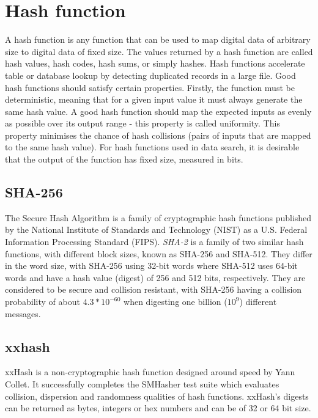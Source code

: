 \section{Hash function}
  A hash function is any function that can be used to map digital data of arbitrary size to digital data of fixed size. The values returned by a hash function are called hash values, hash codes, hash sums, or simply hashes. Hash functions accelerate table or database lookup by detecting duplicated records in a large file. Good hash functions should satisfy certain properties. Firstly, the function must be deterministic, meaning that for a given input value it must always generate the same hash value. A good hash function should map the expected inputs as evenly as possible over its output range - this property is called uniformity. This property minimises the chance of hash collisions (pairs of inputs that are mapped to the same hash value). For hash functions used in data search, it is desirable that the output of the function has fixed size, measured in bits.

  \subsection{SHA-256}
  The Secure Hash Algorithm is a family of cryptographic hash functions published by the National Institute of Standards and Technology (NIST) as a U.S. Federal Information Processing Standard (FIPS). \emph{SHA-2} is a family of two similar hash functions, with different block sizes, known as SHA-256 and SHA-512. They differ in the word size, with SHA-256 using 32-bit words where SHA-512 uses 64-bit words and have a hash value (digest) of 256 and 512 bits, respectively. They are considered to be secure and collision resistant, with SHA-256 having a collision probability of about $4.3*10^{-60}$ when digesting one billion ($10^9$) different messages.

  \subsection{xxhash}
  xxHash\cite{xxhash-src} is a non-cryptographic hash function designed around speed by Yann Collet. It successfully completes the SMHasher test suite which evaluates collision, dispersion and randomness qualities of hash functions. xxHash's digests can be returned as bytes, integers or hex numbers and can be of 32 or 64 bit size.

